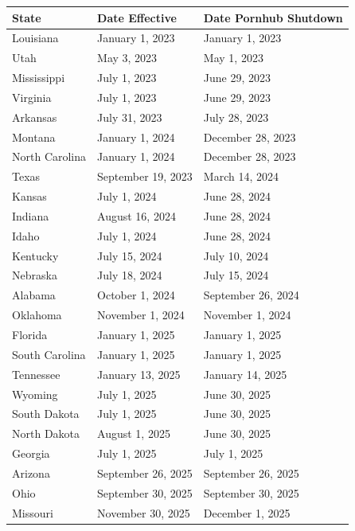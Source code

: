 \begin{tabular}{lll}
\toprule
  State & Date Effective & Date Pornhub Shutdown \\
\midrule
  Louisiana & January 1, 2023 & January 1, 2023 \\
  Utah & May 3, 2023 & May 1, 2023 \\
  Mississippi & July 1, 2023 & June 29, 2023 \\
  Virginia & July 1, 2023 & June 29, 2023 \\
  Arkansas & July 31, 2023 & July 28, 2023 \\
  Montana & January 1, 2024 & December 28, 2023 \\
  North Carolina & January 1, 2024 & December 28, 2023 \\
  Texas & September 19, 2023 & March 14, 2024 \\
  Kansas & July 1, 2024 & June 28, 2024 \\
  Indiana & August 16, 2024 & June 28, 2024 \\
  Idaho & July 1, 2024 & June 28, 2024 \\
  Kentucky & July 15, 2024 & July 10, 2024 \\
  Nebraska & July 18, 2024 & July 15, 2024 \\
  Alabama & October 1, 2024 & September 26, 2024 \\
  Oklahoma & November 1, 2024 & November 1, 2024 \\
  Florida & January 1, 2025 & January 1, 2025 \\
  South Carolina & January 1, 2025 & January 1, 2025 \\
  Tennessee & January 13, 2025 & January 14, 2025 \\
  Wyoming & July 1, 2025 & June 30, 2025 \\
  South Dakota & July 1, 2025 & June 30, 2025 \\
  North Dakota & August 1, 2025 & June 30, 2025 \\
  Georgia & July 1, 2025 & July 1, 2025 \\
  Arizona & September 26, 2025 & September 26, 2025 \\
  Ohio & September 30, 2025 & September 30, 2025 \\
  Missouri & November 30, 2025 & December 1, 2025 \\
\bottomrule
\end{tabular}
